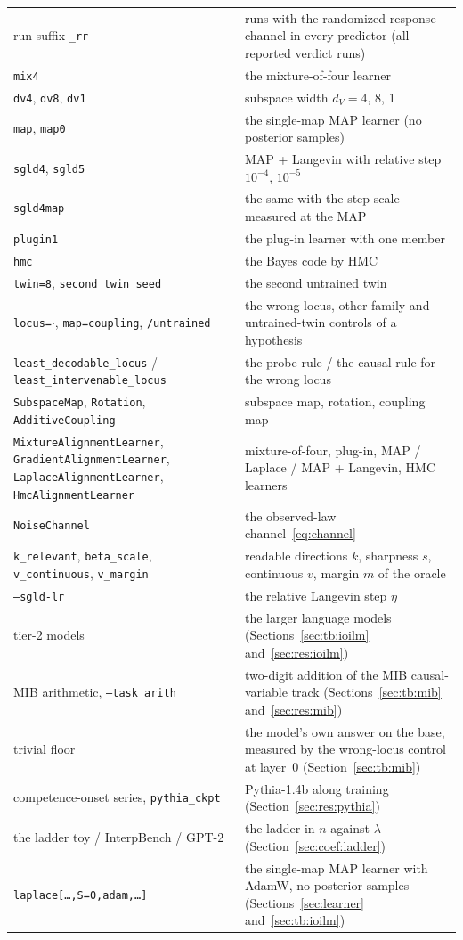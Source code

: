\documentclass[11pt,a4paper]{article}
\newcommand{\dv}{d_V}
\begin{document}
\begin{table}[htbp]
\begin{tabular}{p{}p{}}
\raggedright run suffix \texttt{\_rr} & runs with the randomized-response channel in every predictor (all reported verdict runs)\tabularnewline
\raggedright \texttt{mix4} & the mixture-of-four learner\tabularnewline
\raggedright \texttt{dv4}, \texttt{dv8}, \texttt{dv1} & subspace width $\dv=4$, 8, 1\tabularnewline
\raggedright \texttt{map}, \texttt{map0} & the single-map MAP learner (no posterior samples)\tabularnewline
\raggedright \texttt{sgld4}, \texttt{sgld5} & MAP + Langevin with relative step $10^{-4}$, $10^{-5}$\tabularnewline
\raggedright \texttt{sgld4map} & the same with the step scale measured at the MAP\tabularnewline
\raggedright \texttt{plugin1} & the plug-in learner with one member\tabularnewline
\raggedright \texttt{hmc} & the Bayes code by HMC\tabularnewline
\raggedright \texttt{twin=8}, \texttt{second\_twin\_seed} & the second untrained twin\tabularnewline
\raggedright \texttt{locus=}$\cdot$, \texttt{map=coupling}, \texttt{/untrained} & the wrong-locus, other-family and untrained-twin controls of a hypothesis\tabularnewline
\raggedright \texttt{least\_decodable\_locus} / \texttt{least\_intervenable\_locus} & the probe rule / the causal rule for the wrong locus\tabularnewline
\raggedright \texttt{SubspaceMap}, \texttt{Rotation}, \texttt{AdditiveCoupling} & subspace map, rotation, coupling map\tabularnewline
\raggedright \texttt{MixtureAlignmentLearner}, \texttt{GradientAlignmentLearner}, \texttt{LaplaceAlignmentLearner}, \texttt{HmcAlignmentLearner} & mixture-of-four, plug-in, MAP / Laplace / MAP + Langevin, HMC learners\tabularnewline
\raggedright \texttt{NoiseChannel} & the observed-law channel~\eqref{eq:channel}\tabularnewline
\raggedright \texttt{k\_relevant}, \texttt{beta\_scale}, \texttt{v\_continuous}, \texttt{v\_margin} & readable directions $k$, sharpness $s$, continuous $v$, margin $m$ of the oracle\tabularnewline
\raggedright \texttt{--sgld-lr} & the relative Langevin step $\eta$\tabularnewline
\raggedright tier-2 models & the larger language models (Sections~\ref{sec:tb:ioilm} and~\ref{sec:res:ioilm})\tabularnewline
\raggedright MIB arithmetic, \texttt{--task arith} & two-digit addition of the MIB causal-variable track (Sections~\ref{sec:tb:mib} and~\ref{sec:res:mib})\tabularnewline
\raggedright trivial floor & the model's own answer on the base, measured by the wrong-locus control at layer~0 (Section~\ref{sec:tb:mib})\tabularnewline
\raggedright competence-onset series, \texttt{pythia\_ckpt} & Pythia-1.4b along training (Section~\ref{sec:res:pythia})\tabularnewline
\raggedright the ladder toy / InterpBench / GPT-2 & the ladder in $n$ against $\lambda$ (Section~\ref{sec:coef:ladder})\tabularnewline
\raggedright \texttt{laplace[\dots,S=0,adam,\dots]} & the single-map MAP learner with AdamW, no posterior samples (Sections~\ref{sec:learner} and~\ref{sec:tb:ioilm})\tabularnewline
\bottomrule
\end{tabular}
\end{table}
\end{document}
